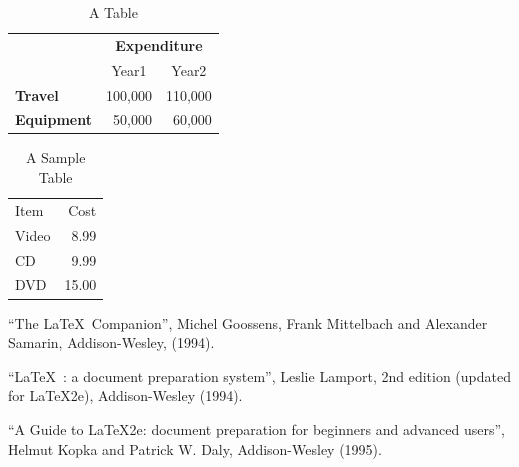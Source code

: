 \documentclass[12pt,captions=tableabove]{scrbook}
\begin{document}
\begin{table}[hbtp]
\caption{A Table}
\label{tab:example}
\centering
\begin{tabular}{lrr}
 & \multicolumn{2}{c}{\bfseries Expenditure}\\
 & \multicolumn{1}{c}{Year1} & \multicolumn{1}{c}{Year2}\\
\bfseries Travel & 100,000 & 110,000\\
\bfseries Equipment & 50,000 & 60,000
\end{tabular}
\end{table}

\begin{table}[hbt]
\caption{A Sample Table}
\label{tab:sample}
\centering
\begin{tabular}{lr}
Item & Cost\\
Video & 8.99\\
CD    & 9.99\\
DVD   & 15.00
\end{tabular}
\end{table}

\begin{thebibliography}{1}
 ``The \LaTeX\ Companion'', Michel Goossens, Frank Mittelbach and
Alexander Samarin, Addison-Wesley, (1994).

 ``\LaTeX\ : a document preparation system'', Leslie Lamport,
2nd edition (updated for \LaTeX2e), Addison-Wesley (1994).

 ``A Guide to \LaTeX2e: document preparation for beginners
and advanced users'', Helmut Kopka and Patrick W. Daly, Addison-Wesley (1995).

\end{thebibliography}
\end{document}
